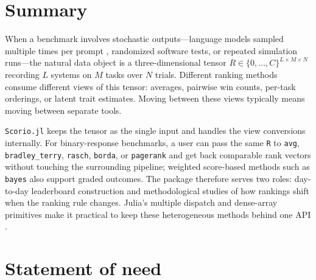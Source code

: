 \documentclass{juliacon}
\newcommand{\scorio}{\texttt{Scorio.jl}}
\begin{document}

\maketitle

\begin{abstract}
    \href{https://github.com/mohsenhariri/scorio}{\scorio{}} is a Julia package for evaluating and ranking systems from repeated responses to shared tasks. It provides a common tensor-based interface for direct score-based, pairwise, psychometric, voting, graph, and listwise methods, so the same benchmark can
    be analyzed under multiple ranking assumptions. We describe the package design, position it relative to existing Julia tools, and report pilot experiments on synthetic rank recovery, stability under limited trials, and runtime scaling.
\end{abstract}

\section{Summary}

When a benchmark involves stochastic outputs---language models sampled multiple times per prompt \cite{snell2025testtime,hariri2026ranking}, randomized software tests, or repeated simulation runs---the natural data object is a three-dimensional tensor \(R \in \{0,\ldots,C\}^{L\times M\times N}\) recording \(L\) systems on \(M\) tasks over \(N\) trials. Different ranking methods consume different views of this tensor: averages, pairwise win counts, per-task orderings, or latent trait estimates. Moving between these views typically means moving between separate tools.

\scorio{} keeps the tensor as the single input and handles the view conversions internally. For binary-response benchmarks, a user can pass the same \texttt{R} to \texttt{avg}, \texttt{bradley\_terry}, \texttt{rasch}, \texttt{borda}, or \texttt{pagerank} and get back comparable rank vectors without touching the surrounding pipeline; weighted score-based methods such as \texttt{bayes} also support graded outcomes. The package therefore serves two roles: day-to-day leaderboard construction and methodological studies of how rankings shift when the ranking rule changes. Julia's multiple dispatch and dense-array primitives make it practical to keep these heterogeneous methods behind one API \cite{bezanson2017julia}.

\section{Statement of need}
\end{document}
